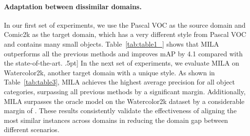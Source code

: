 \documentclass{bmvc2k}
\begin{document}
\begin{table}
\begin{minipage}[t]{.5\textwidth}
   \label{tab:table2}
\end{minipage}\qquad
\begin{minipage}[t]{.45\textwidth}
  \footnotesize	
  \centering
  \addtolength{\tabcolsep}{-3.0pt}
   \caption{Results on the Cityscapes test set for \textbf{Sim10k  Cityscapes} adaptation.} 
   \label{tab:table2_}
\end{minipage}\qquad
\end{table}












\paragraph{Adaptation between dissimilar domains.}
In our first set of experiments, we use the Pascal VOC as the source domain and Comic2k as the target domain, which has a very different style from Pascal VOC and contains many small objects. Table~\ref{tab:table1_} shows that MILA outperforms all the previous methods and improves mAP by 4.1 compared with the state-of-the-art. 
\2.5pt]
In the next set of experiments, we evaluate MILA on Watercolor2k, another target domain with a unique style. As shown in Table~\ref{tab:table3}, MILA achieves the highest average precision for all object categories, surpassing all previous methods by a significant margin. Additionally, MILA surpasses the oracle model on the Watercolor2k dataset by a considerable margin of . 
These results consistently validate the effectiveness of aligning the most similar instances across domains in reducing the domain gap between different scenarios.
\end{document}
